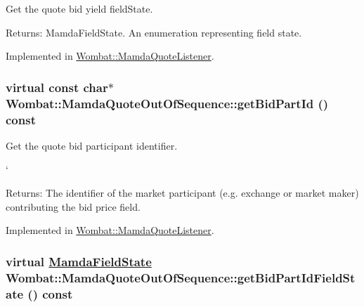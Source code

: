 Get the quote bid yield field\-State. 

\begin{Desc}
\item[Returns:]Mamda\-Field\-State. An enumeration representing field state. \end{Desc}


Implemented in \hyperlink{classWombat_1_1MamdaQuoteListener_98c0e8e6190f6cb27684fd9abcf4a356}{Wombat::Mamda\-Quote\-Listener}.\hypertarget{classWombat_1_1MamdaQuoteOutOfSequence_b48217f292612f65d8a0ab93954a223c}{
\subsubsection[getBidPartId]{\setlength{\rightskip}{0pt plus 5cm}virtual const char$\ast$ Wombat::Mamda\-Quote\-Out\-Of\-Sequence::get\-Bid\-Part\-Id () const}}
\label{classWombat_1_1MamdaQuoteOutOfSequence_b48217f292612f65d8a0ab93954a223c}


Get the quote bid participant identifier. 

`

\begin{Desc}
\item[Returns:]The identifier of the market participant (e.g. exchange or market maker) contributing the bid price field. \end{Desc}


Implemented in \hyperlink{classWombat_1_1MamdaQuoteListener_0256d6b1b2181919a00cf6d6e903b014}{Wombat::Mamda\-Quote\-Listener}.\hypertarget{classWombat_1_1MamdaQuoteOutOfSequence_f98691d7c7a4d1234474a849fbc15c36}{
\subsubsection[getBidPartIdFieldState]{\setlength{\rightskip}{0pt plus 5cm}virtual \hyperlink{namespaceWombat_93aac974f2ab713554fd12a1fa3b7d2a}{Mamda\-Field\-State} Wombat::Mamda\-Quote\-Out\-Of\-Sequence::get\-Bid\-Part\-Id\-Field\-State () const}}
\label{classWombat_1_1MamdaQuoteOutOfSequence_f98691d7c7a4d1234474a849fbc15c36}


